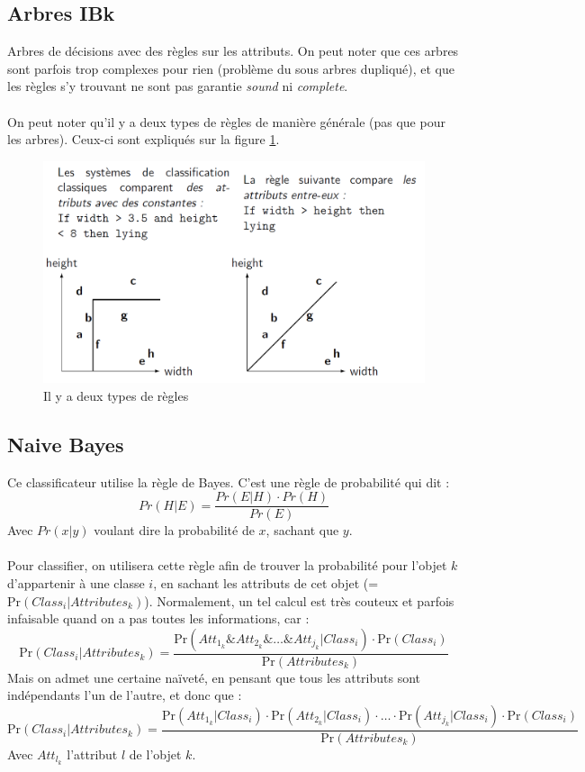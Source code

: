 \documentclass[letterpaper, 12pt]{article}
\newcommand{\alinea}{
\hspace*{0.5cm}}
\begin{document}
		\subsection{Arbres IBk}
			\alinea Arbres de décisions avec des règles sur les attributs.
				On peut noter que ces arbres sont parfois trop complexes
				pour rien (problème du sous arbres dupliqué), et que 
				les règles s'y trouvant ne sont pas garantie \textit{sound}
				ni \textit{complete}. \\
			~\\
			\alinea On peut noter qu'il y a deux types de règles de manière 
				générale (pas que pour les arbres). Ceux-ci sont expliqués
				sur la figure \ref{fig:ibk}.
			\begin{figure}[H]
				\centering
				\includegraphics[scale=0.3]{Images/ibk.png}
				\caption{Il y a deux types de règles}
				\label{fig:ibk}
			\end{figure}\noindent
		\subsection{Naive Bayes}
			\alinea	Ce classificateur utilise la règle de Bayes. C'est une 
				règle de probabilité qui dit : 
				$$ Pr(H | E) = \frac{Pr(E | H) \cdot Pr(H)}{Pr(E)} $$
				Avec $Pr(x | y)$ voulant dire la probabilité de $x$, sachant
				que $y$.\\
			~\\
			\alinea Pour classifier, on utilisera cette règle afin de 
				trouver la probabilité pour l'objet $k$ 
				d'appartenir à une classe $i$, en
				sachant les attributs de cet objet 
				(=$\text{Pr}(Class_i | Attributes_k)$). Normalement, 
				un tel calcul
				est très couteux et parfois infaisable quand on a pas
				toutes les informations, car :
				$$ \text{Pr}(Class_i | Attributes_k) = 
				    \frac{\text{Pr}(Att_{1_k}\& 
					Att_{2_k} \& \ldots \& Att_{j_k}| Class_i) 
					\cdot \text{Pr}(Class_i)}{\text{Pr}(Attributes_k)} $$
				Mais on admet une certaine naïveté, en pensant que tous
				les attributs sont indépendants l'un de l'autre, et donc
				que :
				$$ \text{Pr}(Class_i | Attributes_k) =  \frac{
						\text{Pr}(Att_{1_k} | Class_i) \cdot
						\text{Pr}(Att_{2_k} | Class_i) \cdot
						\ldots \cdot
						\text{Pr}(Att_{j_k} | Class_i) \cdot
						\text{Pr}(Class_i)}{\text{Pr}(Attributes_k)}$$
				Avec $Att_{l_k}$ l'attribut $l$ de l'objet $k$.	
%
\end{document}
